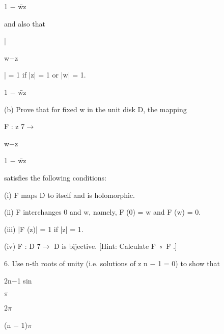1 $-$ w̄z







and also that



|






w$-$z




| = 1 if |z| = 1 or |w| = 1.




1 $-$ w̄z







(b) Prove that for fixed w in the unit disk D, the mapping




F : z 7$\rightarrow$







w$-$z




1 $-$ w̄z







satisfies the following conditions:




(i) F maps D to itself and is holomorphic.




(ii) F interchanges 0 and w, namely, F (0) = w and F (w) = 0.




(iii) |F (z)| = 1 if |z| = 1.




(iv) F : D 7$\rightarrow$ D is bijective. [Hint: Calculate F ◦ F .]




6. Use n-th roots of unity (i.e. solutions of z n $-$ 1 = 0) to show that




2n$-$1 sin







$\pi$




2$\pi$




(n $-$ 1)$\pi$




